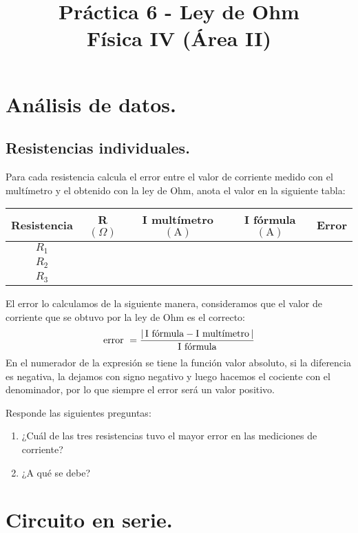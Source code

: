 \documentclass[14pt]{extarticle}
\title{\vspace*{-2cm} Práctica 6 - Ley de Ohm\\  Física IV (Área II) \vspace{-5ex}}
\date{}
\begin{document}
\maketitle

\section{Análisis de datos.}

\subsection{Resistencias individuales.}

Para cada resistencia calcula el error entre el valor de corriente medido con el multímetro y el obtenido con la ley de Ohm, anota el valor en la siguiente tabla:
\begin{table}[H]
\centering
\begin{tabular}{| c | c | c | c | c | } \hline
Resistencia & R $(\Omega)$ & I multímetro $(\si{\ampere})$ & I fórmula $(\si{\ampere})$ & Error \\ \hline
$R_{1}$ & & & & \\ \hline
$R_{2}$ & & & & \\ \hline
$R_{3}$ & & & & \\ \hline
\end{tabular}
\end{table}
El error lo calculamos de la siguiente manera, consideramos que el valor de corriente que se obtuvo por la ley de Ohm es el correcto:
\begin{align*}
\text{error } = \dfrac{\abs{ \, \text{I fórmula} - \text{I multímetro} \, }}{\text{I fórmula}}
\end{align*}
En el numerador de la expresión se tiene la función valor absoluto, si la diferencia es negativa, la dejamos con signo negativo y luego hacemos el cociente con el denominador, por lo que siempre el error será un valor positivo.

Responde las siguientes preguntas:
\begin{enumerate}
\item ¿Cuál de las tres resistencias tuvo el mayor error en las mediciones de corriente?
\item ¿A qué se debe?
\end{enumerate}

\section{Circuito en serie.}
\end{document}
